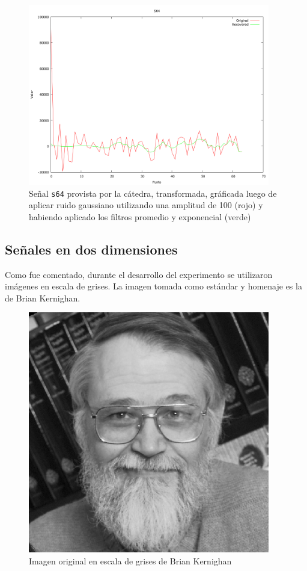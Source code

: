 \begin{figure}
\begin {center}
\includegraphics[width=299pt]{imagenes/s64-gauss100-both-spec.png}
\end {center}
\caption{Se\~nal \texttt{s64} provista por la c\'atedra, transformada, gr\'aficada
luego de aplicar ruido gaussiano utilizando una amplitud de 100 (rojo) y 
habiendo aplicado los filtros promedio y exponencial (verde)}
\label{fig:SinProm}
\end{figure}


\subsection{Se\~nales en dos dimensiones}

Como fue comentado, durante el desarrollo del experimento se utilizaron
im\'agenes en escala de grises. La imagen tomada como est\'andar y homenaje es 
la de Brian Kernighan.

\begin{figure}[H]
\begin {center}
\includegraphics[width=299pt]{imagenes/brian_kernighan.png}
\end {center}
\caption{Imagen original en escala de grises de Brian Kernighan}
\label{fig:SinProm}
\end{figure}

